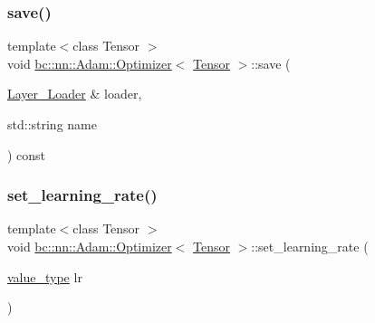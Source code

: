 \subsubsection{\texorpdfstring{save()}{save()}}
{\footnotesize\ttfamily template$<$class Tensor $>$ \\
void \hyperlink{structbc_1_1nn_1_1Adam_1_1Optimizer}{bc\+::nn\+::\+Adam\+::\+Optimizer}$<$ \hyperlink{namespacebc_a659391e47ab612be3ba6c18cf9c89159}{Tensor} $>$\+::save (\begin{DoxyParamCaption}\item[{\hyperlink{structbc_1_1nn_1_1Layer__Loader}{Layer\+\_\+\+Loader} \&}]{loader,  }\item[{std\+::string}]{name }\end{DoxyParamCaption}) const\hspace{0.3cm}{\ttfamily [inline]}}

\mbox{\label{structbc_1_1nn_1_1Adam_1_1Optimizer_a1e31083035a2408d089428cdf48b318c}} 
\subsubsection{\texorpdfstring{set\+\_\+learning\+\_\+rate()}{set\_learning\_rate()}}
{\footnotesize\ttfamily template$<$class Tensor $>$ \\
void \hyperlink{structbc_1_1nn_1_1Adam_1_1Optimizer}{bc\+::nn\+::\+Adam\+::\+Optimizer}$<$ \hyperlink{namespacebc_a659391e47ab612be3ba6c18cf9c89159}{Tensor} $>$\+::set\+\_\+learning\+\_\+rate (\begin{DoxyParamCaption}\item[{\hyperlink{structbc_1_1nn_1_1Adam_1_1Optimizer_a6c0f45fad49cbec9368339576806cb75}{value\+\_\+type}}]{lr }\end{DoxyParamCaption})\hspace{0.3cm}{\ttfamily [inline]}}

\mbox{\label{structbc_1_1nn_1_1Adam_1_1Optimizer_a6f24191f989e2ee969535ef87c47ac8c}} 
